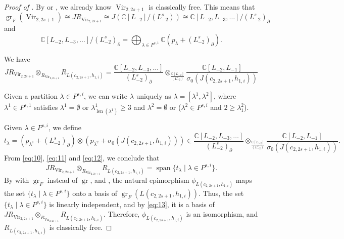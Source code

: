 \documentclass[a4paper, 12pt, reqno]{amsart}
\theoremstyle{remark}
\DeclareMathOperator{\Vir}{Vir}
\DeclareMathOperator{\len}{len}
\DeclareMathOperator{\gr}{gr}
\DeclareMathOperator{\vspan}{span}
\begin{document}
\begin{proof}[Proof of ]
  By \cite{van_ekeren_chiral_2021} or \cite{bruschek_arc_2013}, we already know $\Vir_{2, 2s + 1}$ is classically free.
  This means that $\gr_F(\Vir_{2, 2s + 1}) \cong JR_{\Vir_{2, 2s + 1}} \cong J(\mathbb{C}[L_{-2}]/(L_{-2}^s)) \cong \mathbb{C}[L_{-2}, L_{-3}, \dots]/(L_{-2}^s)_{\partial}$ and
  \begin{equation}
    \label{eq:11}
    \mathbb{C}[L_{-2}, L_{-3}, \dots]/(L_{-2}^s)_{\partial} = \bigoplus_{\lambda \in P^{s, 1}}\mathbb{C}(p_{\lambda} + (L_{-2}^s)_{\partial}).
  \end{equation}

  We have
  \begin{equation}
    \label{eq:12}
    JR_{\Vir_{2, 2s + 1}} \otimes_{R_{\Vir_{2, 2s + 1}}} R_{L(c_{2, 2s + 1}, h_{1, i})} = \frac{\mathbb{C}[L_{-2}, L_{-3}, \dots]}{(L_{-2}^s)_{\partial}} \otimes_{\frac{\mathbb{C}[L_{-2}]}{(L_{-2}^s)}}\frac{\mathbb{C}[L_{-2}, L_{-1}]}{\sigma_0(J(c_{2, 2s + 1}, h_{1, i}))}
  \end{equation}

  Given a partition $\lambda \in P^{s, i}$, we can write $\lambda$ uniquely as $\lambda = [\lambda^1, \lambda^2]$, where $\lambda^1 \in P^{s, 1}$ satisfies $\lambda^1 = \emptyset$ or $\lambda^1_{\len(\lambda^1)} \ge 3$ and $\lambda^2 = \emptyset$ or ($\lambda^2 \in P^{s, i}$ and $2 \ge \lambda^2_1$).

  Given $\lambda \in P^{s, i}$, we define
  \begin{equation*}
    t_{\lambda} = (p_{\lambda^1} + (L_{-2}^s)_{\partial})\otimes(p_{\lambda^2} + \sigma_0(J(c_{2, 2s + 1}, h_{1, i}))) \in \frac{\mathbb{C}[L_{-2}, L_{-3}, \dots]}{(L_{-2}^s)_{\partial}} \otimes_{\frac{\mathbb{C}[L_{-2}]}{(L_{-2}^s)}} \frac{\mathbb{C}[L_{-2}, L_{-1}]}{\sigma_0(J(c_{2, 2s + 1}, h_{1, i}))}.
  \end{equation*}
  From \eqref{eq:10}, \eqref{eq:11} and \eqref{eq:12}, we conclude that
  \begin{equation}
    \label{eq:13}
    JR_{\Vir_{2, 2s + 1}} \otimes_{R_{\Vir_{2, 2s + 1}}} R_{L(c_{2, 2s + 1}, h_{1, i})} = \vspan\{t_{\lambda} \mid \lambda \in P^{s, i}\}.
  \end{equation}
  By  with $\gr_F$ instead of $\gr$,  and , the natural epimorphism $\phi_{L(c_{2, 2s + 1}, h_{1, i})}$ maps the set $\{t_{\lambda} \mid \lambda \in P^{s, i}\}$ onto a basis of $\gr_F(L(c_{2, 2s + 1}, h_{1, i}))$.
  Thus, the set $\{t_{\lambda} \mid \lambda \in P^{s, i}\}$ is linearly independent, and by \eqref{eq:13}, it is a basis of $JR_{\Vir_{2, 2s + 1}} \otimes_{R_{\Vir_{2, 2s + 1}}} R_{L(c_{2, 2s + 1}, h_{1, i})}$.
  Therefore, $\phi_{L(c_{2, 2s + 1}, h_{1, i})}$ is an isomorphism, and $R_{L(c_{2, 2s + 1}, h_{1, i})}$ is classically free.


\end{proof}
\end{document}
